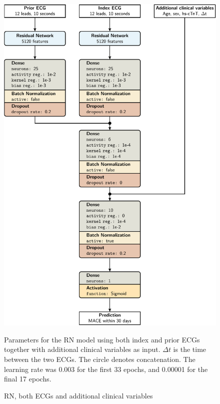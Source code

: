 \documentclass[preprint]{elsarticle}
\begin{document}
\begin{figure}[H]
\centering
\includegraphics[scale=\modelscale,keepaspectratio]{figures/model-rn4.pdf}
\caption{RN, both ECGs and additional clinical variables}
\medskip
\small
Parameters for the RN model using both index and prior ECGs together with additional clinical variables as input. $\Delta t$ is the time between the two ECGs. The circle denotes concatenation. The learning rate was 0.003 for the first 33 epochs, and 0.00001 for the final 17 epochs. 
\end{figure}
\end{document}

